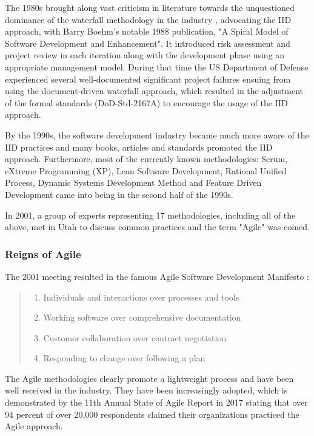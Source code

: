 \documentclass{article}
\begin{document}
The 1980s brought along vast criticism in literature towards the unquestioned dominance of the waterfall methodology in the industry \cite{larman2003iterative}, advocating the IID approach, with Barry Boehm's notable 1988 publication, "A Spiral Model of Software Development and Enhancement". It introduced risk assessment and project review in each iteration along with the development phase using an appropriate management model. During that time the US Department of Defense experienced several well-documented significant project failures ensuing from using the document-driven waterfall approach, which resulted in the adjustment of the formal standards (DoD-Std-2167A) to encourage the usage of the IID approach.

By the 1990s, the software development industry became much more aware of the IID practices and many books, articles and standards promoted the IID approach. Furthermore, most of the currently known methodologies: Scrum, eXtreme Programming (XP), Lean Software Development, Rational Unified Process, Dynamic Systems Development Method and Feature Driven Development came into being in the second half of the 1990s.

In 2001, a group of experts representing 17 methodologies, including all of the above, met in Utah to discuss common practices and the term "Agile" was coined.

\subsubsection{Reigns of Agile}

The 2001 meeting resulted in the famous Agile Software Development Manifesto \cite{beck2001Agile}:
\begin{quote}
\begin{enumerate}
  \item Individuals and interactions over processes and tools
  \item Working software over comprehensive documentation
  \item Customer collaboration over contract negotiation
  \item Responding to change over following a plan
\end{enumerate}
\end{quote}

The Agile methodologies clearly promote a lightweight process and have been well received in the industry. They have been increasingly adopted, which is demonstrated by the 11th Annual State of Agile Report in 2017 \cite{one201711th} stating that over 94 percent of over 20,000 respondents claimed their organizations practiced the Agile approach.
\end{document}

